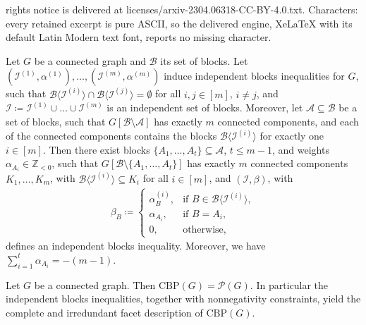 \documentclass[10pt,a4paper]{amsart}
\newcommand{\A}{\mathcal{A}}
\newcommand{\B}{\mathcal{B}}
\newcommand{\CBP}{\mathrm{CBP}}
\newcommand{\I}{\mathcal{I}}
\newcommand{\Z}{\mathbb{Z}}
\renewcommand{\P}{\mathcal{P}}
\begin{document}
rights notice is delivered at licenses/arxiv-2304.06318-CC-BY-4.0.txt. Characters: every retained excerpt is pure ASCII, so the delivered engine, XeLaTeX with its default Latin Modern text font, reports no missing character.
\begin{lemma}
\label{combining}
Let $G$ be a connected graph and $\B$ its set of blocks. Let $(\I^{(1)},\alpha^{(1)}), \ldots, (\I^{(m)},\alpha^{(m)})$ induce independent blocks inequalities for $G$, such that $\B\langle \I^{(i)}\rangle \cap \B\langle \I^{(j)}\rangle= \emptyset$ for all $i,j \in [m]$, $i \neq j$, and $\I \coloneqq \I^{(1)} \cup \ldots \cup \I^{(m)}$ is an independent set of blocks. Moreover, let $\A \subseteq \B$ be a set of blocks, such that $G[\B \setminus \A]$ has exactly $m$ connected components, and each of the connected components contains the blocks $\B\langle \I^{(i)} \rangle$ for exactly one $i \in [m]$. Then there exist blocks $\{A_1,\ldots,A_t\} \subseteq \A$, $t \le m-1$, and weights $\alpha_{A_i} \in \Z_{<0}$, such that $G[\B \setminus \{A_1,\ldots,A_t\}]$ has exactly $m$ connected components $K_1,\ldots,K_m$, with $\B\langle \I^{(i)} \rangle \subseteq K_i$ for all $i \in [m]$, and $(\I,\beta)$, with
\begin{align*}
    \beta_B \coloneqq \begin{cases} \alpha^{(i)}_B, &\text{if } B \in \B\langle \I^{(i)}\rangle, \\
                                    \alpha_{A_i}, &\text{if } B=A_i, \\
                                    0, &\text{otherwise},
    \end{cases}
\end{align*}
defines an independent blocks inequality. Moreover, we have $\sum_{i=1}^t \alpha_{A_i}=-(m-1)$.
\end{lemma}

\begin{theorem}
    \label{completefacets}
    Let $G$ be a connected graph. Then $\CBP(G) = \P(G)$. In particular the independent blocks inequalities, together with nonnegativity constraints, yield the complete and irredundant facet description of $\CBP(G)$.
\end{theorem}
\end{document}
